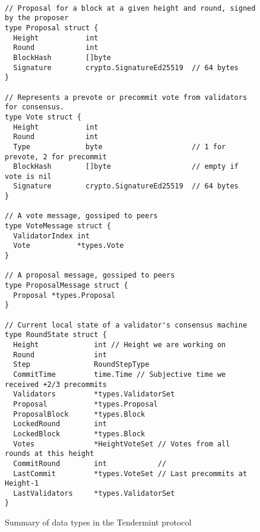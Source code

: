 \lstset{xleftmargin=-1in}
\begin{figure}[]
\vspace*{-1.5in}
	\begin{lstlisting}

// Proposal for a block at a given height and round, signed by the proposer
type Proposal struct {
  Height           int                     
  Round            int                     
  BlockHash        []byte                  
  Signature        crypto.SignatureEd25519  // 64 bytes
}

// Represents a prevote or precommit vote from validators for consensus.
type Vote struct {
  Height           int                     
  Round            int                     
  Type             byte                     // 1 for prevote, 2 for precommit
  BlockHash        []byte                   // empty if vote is nil
  Signature        crypto.SignatureEd25519  // 64 bytes
}

// A vote message, gossiped to peers
type VoteMessage struct {
  ValidatorIndex int
  Vote           *types.Vote
}

// A proposal message, gossiped to peers
type ProposalMessage struct {
  Proposal *types.Proposal
}

// Current local state of a validator's consensus machine
type RoundState struct {
  Height             int // Height we are working on
  Round              int
  Step               RoundStepType
  CommitTime         time.Time // Subjective time we received +2/3 precommits 
  Validators         *types.ValidatorSet
  Proposal           *types.Proposal
  ProposalBlock      *types.Block
  LockedRound        int
  LockedBlock        *types.Block
  Votes              *HeightVoteSet // Votes from all rounds at this height
  CommitRound        int            //
  LastCommit         *types.VoteSet // Last precommits at Height-1
  LastValidators     *types.ValidatorSet
}
	\end{lstlisting}
	\caption[Summary of Tendermint protocol data types]{Summary of data types in the Tendermint protocol}
	\label{fig:tendermint_types}
\end{figure}


